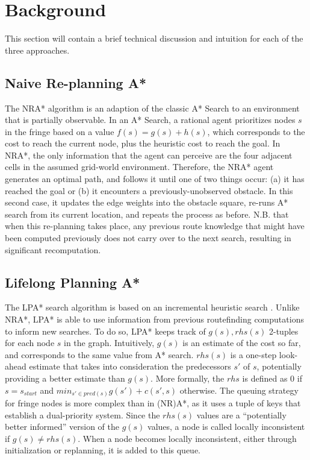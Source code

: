 

\section{Background}
	This section will contain a brief technical discussion and intuition for each of the three approaches.
	
	\subsection{Naive Re-planning A*}
	    The NRA* algorithm is an adaption of the classic A* Search to an environment that is partially observable. In an A* Search, a rational agent prioritizes nodes $s$ in the fringe based on a value $f(s) = g(s)+h(s)$, which corresponds to the cost to reach the current node, plus the heuristic cost to reach the goal. In NRA*, the only information that the agent can perceive are the four adjacent cells in the assumed grid-world environment. Therefore, the NRA* agent generates an optimal path, and follows it until one of two things occur: (a) it has reached the goal or (b) it encounters a previously-unobserved obstacle. In this second case, it updates the edge weights into the obstacle square, re-runs A* search from its current location, and repeats the process as before. N.B. that when this re-planning takes place, any previous route knowledge that might have been computed previously does not carry over to the next search, resulting in significant recomputation.

	\subsection{Lifelong Planning A*}
	    The LPA* search algorithm is based on an incremental heuristic search \cite{koenig2002d} \cite{koenig2002improved}. Unlike NRA*, LPA* is able to use information from previous routefinding computations to inform new searches. To do so, LPA* keeps track of $g(s), rhs(s)$ 2-tuples for each node $s$ in the graph. Intuitively, $g(s)$ is an estimate of the cost so far, and corresponds to the same value from A* search. $rhs(s)$ is a one-step look-ahead estimate that takes into consideration the predecessors $s'$ of $s$, potentially providing a better estimate than $g(s)$. More formally, the $rhs$ is defined as 0 if $s=s_{start}$ and $min_{s'\in pred(s)} g(s')+c(s',s)$ otherwise. The queuing strategy for fringe nodes is more complex than in (NR)A*, as it uses a tuple of keys that establish a dual-priority system. Since the $rhs(s)$ values are a ``potentially better informed'' version of the $g(s)$ values, a node is called locally inconsistent if $g(s) \neq rhs(s)$. When a node becomes locally inconsistent, either through initialization or replanning, it is added to this queue.
	    
